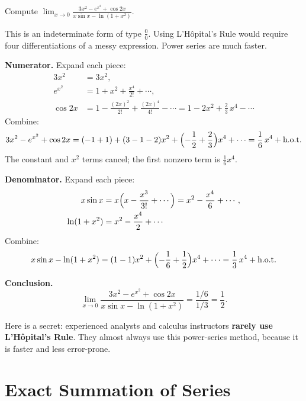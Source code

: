 \begin{example}
\label{ex:14-14}
Compute $\displaystyle\lim_{x\to 0}\frac{3x^{2}-e^{x^{2}}+\cos 2x}{x\sin x - \ln(1+x^{2})}$.

This is an indeterminate form of type $\frac{0}{0}$.  Using L'H\^{o}pital's Rule would require four differentiations of a messy expression.  Power series are much faster.

\textbf{Numerator.}  Expand each piece:
\begin{align*}
  3x^{2} &= 3x^{2}, \\
  e^{x^{2}} &= 1 + x^{2} + \frac{x^{4}}{2!} + \cdots, \\
  \cos 2x &= 1 - \frac{(2x)^{2}}{2!} + \frac{(2x)^{4}}{4!} - \cdots
  = 1 - 2x^{2} + \frac{2}{3}\,x^{4} - \cdots
\end{align*}
Combine:
\[
  3x^{2} - e^{x^{2}} + \cos 2x
  = (-1+1) + (3-1-2)x^{2} + \Bigl(-\frac{1}{2}+\frac{2}{3}\Bigr)x^{4}+\cdots
  = \frac{1}{6}\,x^{4} + \text{h.o.t.}
\]
The constant and $x^{2}$ terms cancel; the first nonzero term is $\frac{1}{6}x^{4}$.

\textbf{Denominator.}  Expand each piece:
\begin{align*}
  x\sin x &= x\Bigl(x - \frac{x^{3}}{3!}+\cdots\Bigr) = x^{2} - \frac{x^{4}}{6}+\cdots, \\
  \ln(1+x^{2}) &= x^{2} - \frac{x^{4}}{2} + \cdots
\end{align*}
Combine:
\[
  x\sin x - \ln(1+x^{2})
  = (1-1)x^{2} + \Bigl(-\frac{1}{6}+\frac{1}{2}\Bigr)x^{4}+\cdots
  = \frac{1}{3}\,x^{4} + \text{h.o.t.}
\]

\textbf{Conclusion.}
\[
  \lim_{x\to 0}\frac{3x^{2}-e^{x^{2}}+\cos 2x}{x\sin x - \ln(1+x^{2})}
  = \frac{1/6}{1/3}
  = \frac{1}{2}.
\]
\end{example}

\begin{remark}
Here is a secret: experienced analysts and calculus instructors \textbf{rarely use L'H\^{o}pital's Rule}.  They almost always use this power-series method, because it is faster and less error-prone.
\end{remark}

\section{Exact Summation of Series}
\label{sec:14.14}

